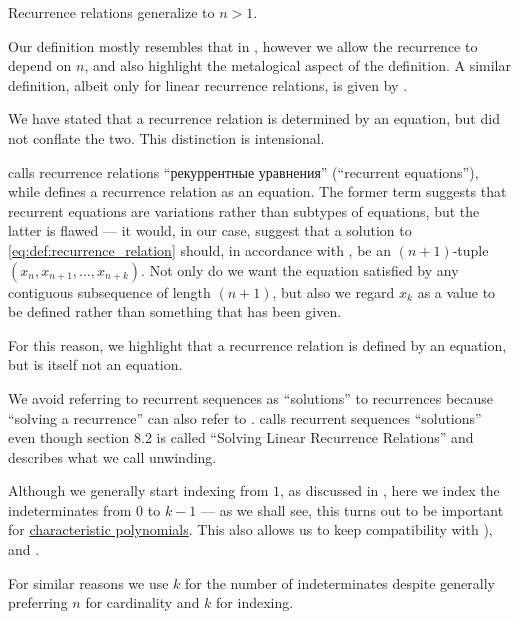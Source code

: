 \begin{comments}
  \item Recurrence relations generalize  to \( n > 1 \).

  \item Our definition mostly resembles that in , however we allow the recurrence to depend on \( n \), and also highlight the metalogical aspect of the definition. A similar definition, albeit only for linear recurrence relations, is given by .

  \item We have stated that a recurrence relation is determined by an equation, but did not conflate the two. This distinction is intensional.

   calls recurrence relations \enquote{рекуррентные уравнения} (\enquote{recurrent equations}), while  defines a recurrence relation as an equation. The former term suggests that recurrent equations are variations rather than subtypes of equations, but the latter is flawed --- it would, in our case, suggest that a solution to \eqref{eq:def:recurrence_relation} should, in accordance with , be an \( (n + 1) \)-tuple \( (x_n, x_{n+1}, \ldots, x_{n+k}) \). Not only do we want the equation satisfied by any contiguous subsequence of length \( (n + 1) \), but also we regard \( x_k \) as a value to be defined rather than something that has been given.

  For this reason, we highlight that a recurrence relation is defined by an equation, but is itself not an equation.

  \item We avoid referring to recurrent sequences as \enquote{solutions} to recurrences because \enquote{solving a recurrence} can also refer to .  calls recurrent sequences \enquote{solutions} even though section 8.2 is called \enquote{Solving Linear Recurrence Relations} and describes what we call unwinding.

  \item Although we generally start indexing from \( 1 \), as discussed in , here we index the indeterminates from \( 0 \) to \( k - 1 \) --- as we shall see, this turns out to be important for \hyperref[def:linear_recurrence_characteristic_polynomial]{characteristic polynomials}. This also allows us to keep compatibility with ),  and .

  For similar reasons we use \( k \) for the number of indeterminates despite generally preferring \( n \) for cardinality and \( k \) for indexing.
\end{comments}

